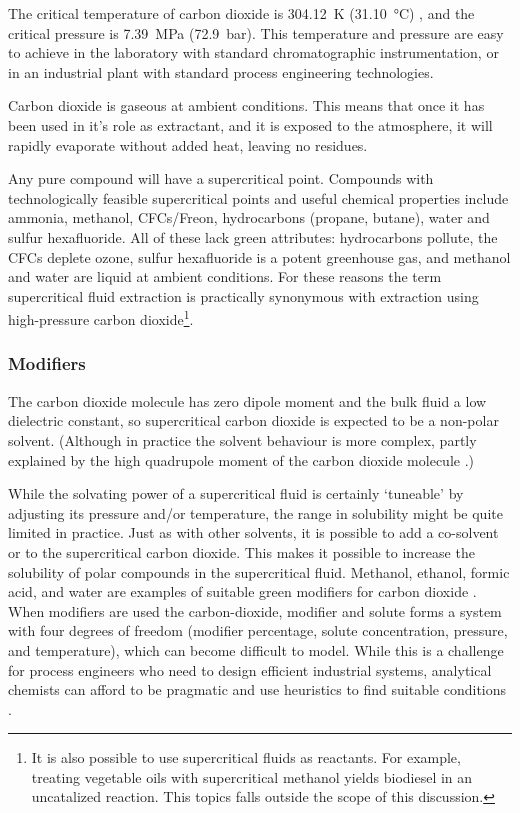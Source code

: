 The critical temperature of carbon dioxide is \SI{304.12}{\kelvin}
(\SI{31.10}{\celsius}) , and the critical pressure is \SI{7.39}{\mega\pascal}
(\SI{72.9}{\bar}). This temperature and pressure are easy to achieve in the
laboratory with standard chromatographic instrumentation, or in an industrial
plant with standard process engineering technologies.

Carbon dioxide is gaseous at ambient conditions. This means that once it has
been used in it's role as extractant, and it is exposed to the atmosphere, it
will rapidly evaporate without added heat, leaving no residues.

Any pure compound will have a supercritical point. Compounds with
technologically feasible supercritical points and useful chemical properties
include ammonia, methanol, CFCs/Freon, hydrocarbons (propane, butane), water and
sulfur hexafluoride. All of these lack green attributes: hydrocarbons pollute,
the CFCs deplete ozone, sulfur hexafluoride is a potent greenhouse gas, and
methanol and water are liquid at ambient conditions. For these reasons the term
supercritical fluid extraction is practically synonymous with extraction using
high-pressure carbon dioxide\footnote{It is also possible to use supercritical
fluids as reactants. For example, treating vegetable oils with supercritical
methanol yields biodiesel in an uncatalized reaction.  This topics falls outside
the scope of this discussion.}.

 
\subsubsection{Modifiers}

\label{sec:modifiers}

The carbon dioxide molecule has zero dipole moment and the bulk fluid a low
dielectric constant, so supercritical carbon dioxide is expected to be
a non-polar solvent. (Although in practice the solvent behaviour is more
complex, partly explained by the high quadrupole moment of the carbon dioxide
molecule \autocite{Raveendran2005}.)

While the solvating power of a supercritical fluid is certainly `tuneable' by
adjusting its pressure and/or temperature, the range in solubility might be
quite limited in practice. Just as with other solvents, it is possible to add a
co-solvent or  to the supercritical carbon dioxide. This makes
it possible to increase the solubility of polar compounds in the supercritical
fluid. Methanol, ethanol, formic acid, and water are examples of suitable green
modifiers for carbon dioxide \autocite{Herrero2010}. When modifiers are used the
carbon-dioxide, modifier and solute forms a system with four degrees of freedom
(modifier percentage, solute concentration, pressure, and temperature), which
can become difficult to model. While this is a challenge for process engineers
who need to design efficient industrial systems, analytical chemists can afford
to be pragmatic and use heuristics to find suitable conditions
\autocite{Wells2003}.

